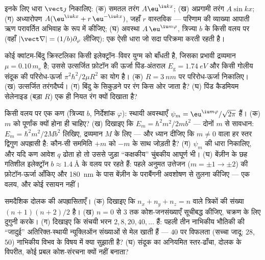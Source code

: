 \begin{exercise}[$\star$]\label{exo:b3:schrodinger-three-dimensions:3}
इनके लिए धारा $\vect\jmath$ निकालिए: (क) समतल तरंग
$A\eu^{\iu kx}$; (ख) अप्रगामी तरंग $A\sin kx$; (ग)
अध्यारोपण $A(\eu^{\iu kx} + r\,\eu^{-\iu kx})$, जहाँ $r$ वास्तविक ---
परिणाम की व्याख्या आपाती ऋण परावर्तित अभिवाह के रूप में कीजिए; (घ)
अवस्था $A\,\eu^{\iu m\varphi}$, त्रिज्या $b$ के किसी वलय पर
(वहाँ $|\vect\nabla|
= (1/b)\partial_\varphi$ लीजिए): एक ऐसी धारा जो सदा परिक्रमा करती रहती है।
\end{exercise}

\begin{exercise}[$\star$]\label{exo:b3:schrodinger-three-dimensions:4}
कोई क्वांटम-बिंदु क्रिस्टलिका किसी इलेक्ट्रॉन--विवर युग्म को बाँधती
है, जिसका प्रभावी द्रव्यमान $\mu = 0.10\,m_{\text{e}}$ है; उससे
उत्सर्जित फ़ोटॉन की ऊर्जा पिंड-अंतराल $E_{\text{g}} = \qty{1.74}{eV}$
और किसी गोलीय संदूक की परिरोध-ऊर्जा $\pi^2\hbar^2/2\mu R^2$ का योग
है। (क) $R = \qty{3}{nm}$ पर परिरोध-ऊर्जा निकालिए। (ख) उत्सर्जित
तरंगदैर्घ्य। (ग) बिंदु के सिकुड़ने पर रंग किस ओर जाता है? (घ)
पिंड कैडमियम सेलेनाइड (बड़ा $R$) एक ही नियत रंग क्यों दिखाता है?
\end{exercise}

\begin{exercise}[$\star\star$]\label{exo:b3:schrodinger-three-dimensions:5}
किसी वलय पर एक कण (त्रिज्या $b$, निर्देशांक $\varphi$): स्थायी
अवस्थाएँ $\psi_m = \eu^{\iu m\varphi}/\sqrt{2\pi}$ हैं। (क)
$m$ को पूर्णांक क्यों होना ही चाहिए? (ख) दिखाइए कि $E_m = \hbar^2m^2/2mb^2$ ---
दोनों $m$ से सावधान: $E_m = \hbar^2 m^2/2Mb^2$ लिखिए, द्रव्यमान $M$
के लिए --- और ध्यान दीजिए कि $m \neq 0$ वाला हर स्तर द्विगुण अपह्रासी है:
कौन-सी सममिति $+m$ को $-m$ के साथ जोड़ती है? (ग) $\psi_m$ की धारा
निकालिए, और यदि कण आवेश $q$ ढोता हो तो उससे जुड़ा ``कक्षकीय'' चुंबकीय
आघूर्ण भी। (घ) बेंज़ीन के छह गतिशील इलेक्ट्रॉन
$b \approx \qty{1.4}{\angstrom}$ के वलय पर रहते हैं: पहले अनुमत
उत्तेजन ($m = \pm1 \to \pm2$) की फ़ोटॉन-ऊर्जा आँकिए और
\qty{180}{nm} के पास बेंज़ीन के पराबैंगनी अवशोषण से तुलना कीजिए ---
एक वलय, और कोई रसायन नहीं।
\end{exercise}

\begin{exercise}[$\star\star$]\label{exo:b3:schrodinger-three-dimensions:6}
समदैशिक दोलक की अपह्रासिताएँ। (क) दिखाइए कि
$n_x + n_y + n_z = n$ वाले त्रिकों की संख्या $(n+1)(n+2)/2$ है। (ख)
$n = 0$ से $3$ तक कोश-जनसंख्याएँ सूचीबद्ध कीजिए, चक्रण के लिए दुगुनी
करके। (ग) दिखाइए कि संचयी भरन $2, 8, 20, 40, \dots$ हैं: पहली तीन
नाभिकीय भौतिकी की ``जादुई'' अतिरिक्त-स्थायी न्यूक्लिऑन संख्याओं से मेल
खाती हैं --- $40$ पर विफलता (सच्चा जादू: $28$, $50$) नाभिकीय विभव के
विषय में क्या सुझाती है? (घ) संदूक का अनियमित स्तर-ढाँचा, दोलक के
विपरीत, कोई प्रबल कोश-संरचना क्यों नहीं बनाता?
\end{exercise}

